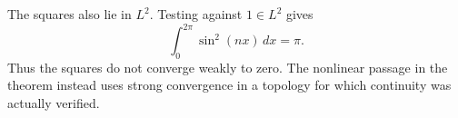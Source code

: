 \documentclass[12pt,reqno]{amsart}
\begin{document}
The squares also lie in $L^2$. Testing against $1\in L^2$ gives
\[
 \int_0^{2\pi}\sin^2(nx)\,dx=\pi.
\]
Thus the squares do not converge weakly to zero. The nonlinear passage
in the theorem instead uses strong convergence in a topology for which
continuity was actually verified.



\end{document}
